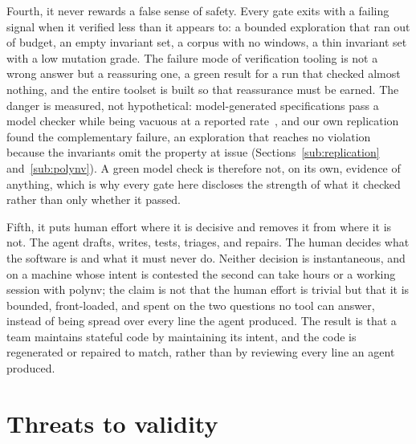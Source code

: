 \documentclass[11pt]{article}
\begin{document}
Fourth, it never rewards a false sense of safety. Every gate exits with a
failing signal when it verified less than it appears to: a bounded exploration
that ran out of budget, an empty invariant set, a corpus with no windows, a thin
invariant set with a low mutation grade. The failure mode of verification
tooling is not a wrong answer but a reassuring one, a green result for a run that
checked almost nothing, and the entire toolset is built so that reassurance must
be earned. The danger is measured, not hypothetical: model-generated
specifications pass a model checker while being vacuous at a reported
rate~\cite{tlaprover}, and our own replication found the complementary failure,
an exploration that reaches no violation because the invariants omit the property
at issue (Sections~\ref{sub:replication} and~\ref{sub:polynv}). A green model
check is therefore not, on its own, evidence of anything, which is why every gate
here discloses the strength of what it checked rather than only whether it
passed.

Fifth, it puts human effort where it is decisive and removes it from where it is
not. The agent drafts, writes, tests, triages, and repairs. The human decides
what the software is and what it must never do. Neither decision is
instantaneous, and on a machine whose intent is contested the second can take
hours or a working session with polynv; the claim is not that the human effort is
trivial but that it is bounded, front-loaded, and spent on the two questions no
tool can answer, instead of being spread over every line the agent produced.
The result is that a team maintains stateful code by maintaining its intent, and
the code is regenerated or repaired to match, rather than by reviewing every
line an agent produced.

\section{Threats to validity}
\end{document}
